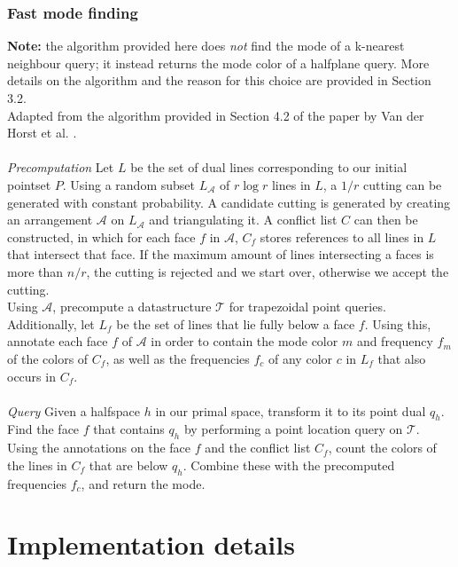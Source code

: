 \documentclass{article}
\begin{document}
\subsubsection{Fast mode finding}
\textbf{Note: } the algorithm provided here does \textit{not} find the mode of a k-nearest neighbour query; it instead returns the mode color of a halfplane query. More details on the algorithm and the reason for this choice are provided in Section 3.2. \\
Adapted from the algorithm provided in Section 4.2 of the paper by Van der Horst et al. \cite{vanderhorst_et_al:LIPIcs.ESA.2022.67}. \\\\
\textit{Precomputation} Let $L$ be the set of dual lines corresponding to our initial pointset $P$. Using a random subset $L_{\mathcal{A}}$ of $r \log r$ lines in $L$, a $1/r$ cutting can be generated with constant probability. A candidate cutting is generated by creating an arrangement $\mathcal{A}$ on $L_{\mathcal{A}}$ and triangulating it. A conflict list $C$ can then be constructed, in which for each face $f$ in $\mathcal{A}$, $C_f$ stores references to all lines in $L$ that intersect that face. If the maximum amount of lines intersecting a faces is more than $n/r$, the cutting is rejected and we start over, otherwise we accept the cutting. \\
Using $\mathcal{A}$, precompute a datastructure $\mathcal{T}$ for trapezoidal point queries. Additionally, let $L_f$ be the set of lines that lie fully below a face $f$. Using this, annotate each face $f$ of $\mathcal{A}$ in order to contain the mode color $m$ and frequency $f_m$ of the colors of $C_f$, as well as the frequencies $f_c$ of any color $c$ in $L_f$ that also occurs in $C_f$.\\\\
\textit{Query} Given a halfspace $h$ in our primal space, transform it to its point dual $q_h$. Find the face $f$ that contains $q_h$ by performing a point location query on $\mathcal{T}$. Using the annotations on the face $f$ and the conflict list $C_f$, count the colors of the lines in $C_f$ that are below $q_h$. Combine these with the precomputed frequencies $f_c$, and return the mode.
\section{Implementation details}
\end{document}

